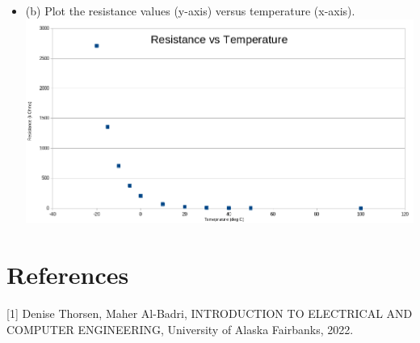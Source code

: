 \documentclass{article}
\begin{document}
\begin{itemize}
\begin{table}[H]
		\end{table}
	\item (b) Plot the resistance values (y-axis) versus temperature (x-axis). \\
		\includegraphics[width=\textwidth]{res_vs_temp}
\end{itemize}

\newpage
\section{References}
[1] Denise Thorsen, Maher Al-Badri, INTRODUCTION TO ELECTRICAL AND COMPUTER ENGINEERING, University of Alaska Fairbanks, 2022.
\end{document}

